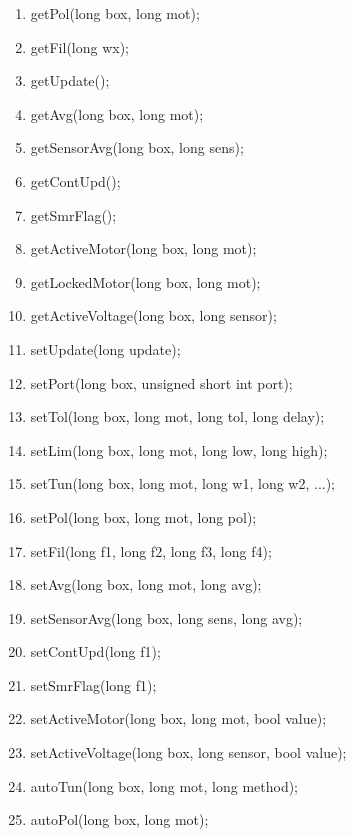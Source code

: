 \documentclass[10pt,letter,twoside]{report}
\begin{document}
\begin{enumerate}
\item getPol(long box, long mot);
\item getFil(long wx);
\item getUpdate();
\item getAvg(long box, long mot);
\item getSensorAvg(long box, long sens);
\item getContUpd();
\item getSmrFlag();
\item getActiveMotor(long box, long mot);
\item getLockedMotor(long box, long mot);
\item getActiveVoltage(long box, long sensor);
\item setUpdate(long update);
\item setPort(long box, unsigned short int port);
\item setTol(long box, long mot, long tol, long delay);
\item setLim(long box, long mot, long low, long high);
\item setTun(long box, long mot, long w1, long w2, ...);
\item setPol(long box, long mot, long pol);
\item setFil(long f1, long f2, long f3, long f4);
\item setAvg(long box, long mot, long avg);
\item setSensorAvg(long box, long sens, long avg);
\item setContUpd(long f1);
\item setSmrFlag(long f1);
\item setActiveMotor(long box, long mot, bool value);
\item setActiveVoltage(long box, long sensor, bool value);
\item autoTun(long box, long mot, long method);
\item autoPol(long box, long mot);
\end{enumerate}
\end{document}
